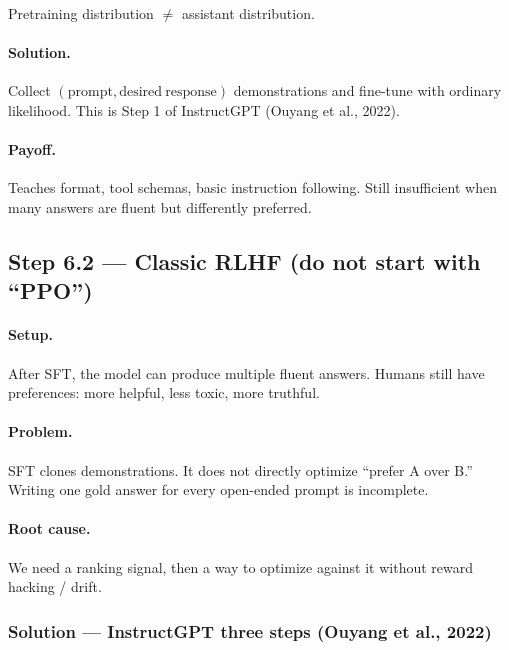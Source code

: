 \documentclass[11pt,a4paper]{article}
\begin{document}
Pretraining distribution $\neq$ assistant distribution.


\paragraph{Solution.}

Collect \((\mathrm{prompt}, \mathrm{desired\ response})\) demonstrations and fine-tune with ordinary likelihood. This is Step 1 of InstructGPT (Ouyang et al., 2022).


\paragraph{Payoff.}

Teaches format, tool schemas, basic instruction following. Still insufficient when many answers are fluent but differently preferred.


\subsection{Step 6.2 --- Classic RLHF (do not start with ``PPO'')}


\paragraph{Setup.}

After SFT, the model can produce multiple fluent answers. Humans still have preferences: more helpful, less toxic, more truthful.


\paragraph{Problem.}

SFT clones demonstrations. It does not directly optimize ``prefer A over B.'' Writing one gold answer for every open-ended prompt is incomplete.


\paragraph{Root cause.}

We need a ranking signal, then a way to optimize against it without reward hacking / drift.


\subsubsection{Solution --- InstructGPT three steps (Ouyang et al., 2022)}
\end{document}
